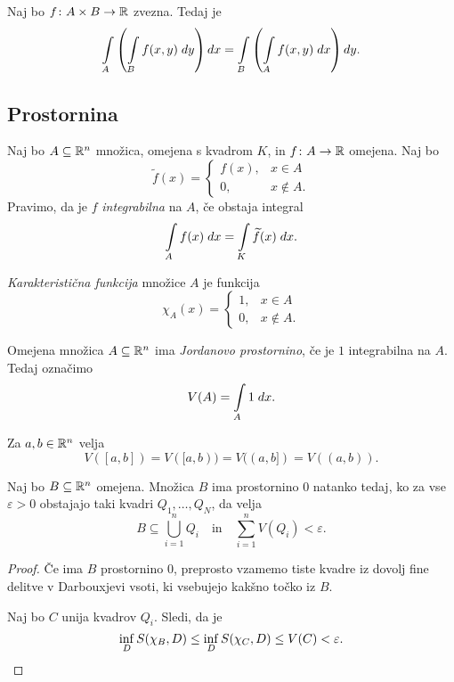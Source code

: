 \begin{posledica}
Naj bo $f \colon A \times B \to \mathbb{R}$ zvezna. Tedaj je
\[
\int\limits_A \left(\int\limits_B f(x,y)\;dy\right) dx =
\int\limits_B \left(\int\limits_A f(x,y)\;dx\right) dy.
\]
\end{posledica}

\newpage

\subsection{Prostornina}

\begin{definicija}
Naj bo $A \subseteq \mathbb{R}^n$ množica, omejena s kvadrom $K$, in
$f \colon A \to \mathbb{R}$ omejena. Naj bo
\[
\widetilde{f}(x) = \begin{cases}
f(x), &x \in A
\\
0, &x \not \in A.
\end{cases}
\]
Pravimo, da je $f$ \emph{integrabilna} na $A$, če obstaja integral
\[
\int\limits_A f(x)\;dx = \int\limits_K \widetilde{f}(x)\;dx.
\]
\end{definicija}

\begin{definicija}
\emph{Karakteristična funkcija}
množice $A$ je funkcija
\[
\chi_A(x) = \begin{cases}
1, &x \in A
\\
0, &x \not \in A.
\end{cases}
\]
\end{definicija}

\begin{definicija}
Omejena množica $A \subseteq \mathbb{R}^n$ ima
\emph{Jordanovo prostornino}, če je
$1$ integrabilna na $A$. Tedaj označimo
\[
V(A) = \int\limits_A 1\;dx.
\]
\end{definicija}

\begin{opomba}
Za $a, b \in \mathbb{R}^n$ velja
\[
V([a,b]) = V([a,b)) = V((a,b]) = V((a,b)).
\]
\end{opomba}

\begin{trditev}
Naj bo $B \subseteq \mathbb{R}^n$ omejena. Množica $B$ ima prostornino $0$
natanko tedaj, ko za vse $\varepsilon > 0$ obstajajo taki kvadri
$Q_1,\dots,Q_N$, da velja
\[
B \subseteq \bigcup_{i=1}^n Q_i
\quad \text{in} \quad
\sum_{i=1}^n V(Q_i) < \varepsilon.
\]
\end{trditev}

\begin{proof}
Če ima $B$ prostornino $0$, preprosto vzamemo tiste kvadre iz
dovolj fine delitve v Darbouxjevi vsoti, ki vsebujejo kakšno točko
iz $B$.

Naj bo $C$ unija kvadrov $Q_i$. Sledi, da je
\[
\inf_D S(\chi_B,D) \leq
\inf_D S(\chi_C,D) \leq
V(C) < \varepsilon. \qedhere
\]
\end{proof}

